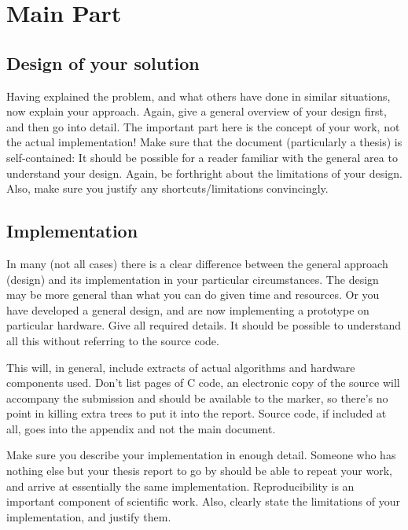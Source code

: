 \documentclass[a4paper,twoside, openright,12pt]{report}
\begin{document}
\chapter{Main Part}

\section{Design of your solution}

Having explained the problem, and what others have done in similar situations, now explain your approach. Again, give a general overview of your design first, and then go into detail. The important part here is the concept of your work, not the actual implementation! Make sure that the document (particularly a thesis) is self-contained: It should be possible for a reader familiar with the general area to understand your design. Again, be forthright about the limitations of your design. Also, make sure you justify any shortcuts/limitations convincingly.

\section{Implementation}

In many (not all cases) there is a clear difference between the general approach (design) and its implementation in your particular circumstances. The design may be more general than what you can do given time and resources. Or you have developed a general design, and are now implementing a prototype on particular hardware. Give all required details. It should be possible to understand all this without referring to the source code. 

This will, in general, include extracts of actual algorithms and hardware components used. Don't list pages of C code, an electronic copy of the source will accompany the submission and should be available to the marker, so there's no point in killing extra trees to put it into the report. Source code, if included at all, goes into the appendix and not the main document.

Make sure you describe your implementation in enough detail. Someone who has nothing else but your thesis report to go by should be able to repeat your work, and arrive at essentially the same implementation. Reproducibility is an important component of scientific work. Also, clearly state the limitations of your implementation, and justify them.
\end{document}

